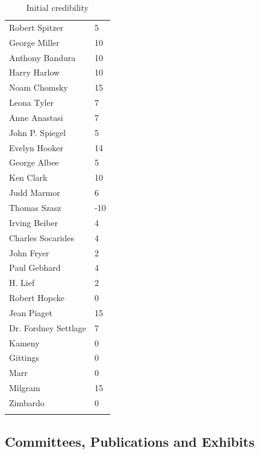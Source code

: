\begin{refsection}
 \begin{longtable}[!t]{ | P{4cm} | P{1.5cm} | }
\hline 
{}& \\ \hline
Robert Spitzer&5 \\ \hline
George Miller&10\\ \hline
Anthony Bandura&10\\ \hline
Harry Harlow&10\\ \hline
Noam Chomsky&15\\ \hline
Leona Tyler&7\\ \hline
Anne Anastasi&7\\ \hline
John P. Spiegel&5\\ \hline
Evelyn Hooker&14\\ \hline
George Albee&5\\ \hline
Ken Clark&10\\ \hline
Judd Marmor&6\\ \hline
Thomas Szasz&-10\\ \hline
Irving Beiber&4\\ \hline
Charles Socarides&4\\ \hline
John Fryer&2\\ \hline
Paul Gebhard&4\\ \hline
H. Lief&2\\ \hline
Robert Hopcke&0\\ \hline
Jean Piaget&15\\ \hline
Dr. Fordney Settlage&7\\ \hline
Kameny &0\\ \hline
Gittings&0\\ \hline
Marr&0\\ \hline
Milgram&15\\ \hline
Zimbardo&0\\ \hline
\caption{Initial credibility}
\label{table: initialcredibility}
\end{longtable}

\subsection{Committees, Publications and Exhibits}
\label{committeespublicationsandexhibits}


\end{refsection}
